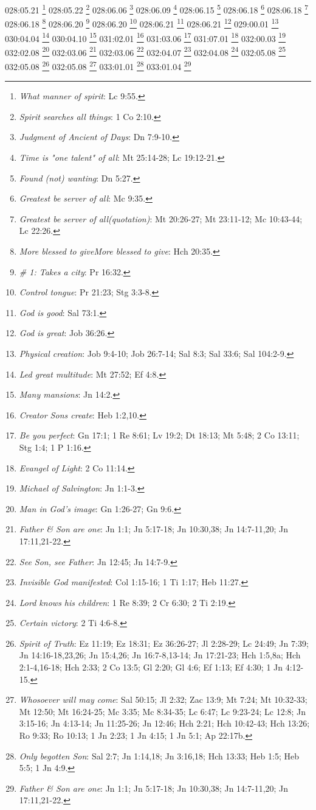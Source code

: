 {028:05.21 \footnote{\textit{What manner of spirit}: Lc 9:55.}
028:05.22 \footnote{\textit{Spirit searches all things}: 1 Co 2:10.}
028:06.06 \footnote{\textit{Judgment of Ancient of Days}: Dn 7:9-10.}
028:06.09 \footnote{\textit{Time is "one talent" of all}: Mt 25:14-28; Lc 19:12-21.}
028:06.15 \footnote{\textit{Found (not) wanting}: Dn 5:27.}
028:06.18 \footnote{\textit{Greatest be server of all}: Mc 9:35.}
028:06.18 \footnote{\textit{Greatest be server of all(quotation)}: Mt 20:26-27; Mt 23:11-12; Mc 10:43-44; Lc 22:26.}
028:06.18 \footnote{\textit{More blessed to giveMore blessed to give}: Hch 20:35.}
028:06.20 \footnote{\textit{# 1: Takes a city}: Pr 16:32.}
028:06.20 \footnote{\textit{Control tongue}: Pr 21:23; Stg 3:3-8.}
028:06.21 \footnote{\textit{God is good}: Sal 73:1.}
028:06.21 \footnote{\textit{God is great}: Job 36:26.}
029:00.01 \footnote{\textit{Physical creation}: Job 9:4-10; Job 26:7-14; Sal 8:3; Sal 33:6; Sal 104:2-9.}
030:04.04 \footnote{\textit{Led great multitude}: Mt 27:52; Ef 4:8.}
030:04.10 \footnote{\textit{Many mansions}: Jn 14:2.}
031:02.01 \footnote{\textit{Creator Sons create}: Heb 1:2,10.}
031:03.06 \footnote{\textit{Be you perfect}: Gn 17:1; 1 Re 8:61; Lv 19:2; Dt 18:13; Mt 5:48; 2 Co 13:11; Stg 1:4; 1 P 1:16.}
031:07.01 \footnote{\textit{Evangel of Light}: 2 Co 11:14.}
032:00.03 \footnote{\textit{Michael of Salvington}: Jn 1:1-3.}
032:02.08 \footnote{\textit{Man in God's image}: Gn 1:26-27; Gn 9:6.}
032:03.06 \footnote{\textit{Father & Son are one}: Jn 1:1; Jn 5:17-18; Jn 10:30,38; Jn 14:7-11,20; Jn 17:11,21-22.}
032:03.06 \footnote{\textit{See Son, see Father}: Jn 12:45; Jn 14:7-9.}
032:04.07 \footnote{\textit{Invisible God manifested}: Col 1:15-16; 1 Ti 1:17; Heb 11:27.}
032:04.08 \footnote{\textit{Lord knows his children}: 1 Re 8:39; 2 Cr 6:30; 2 Ti 2:19.}
032:05.08 \footnote{\textit{Certain victory}: 2 Ti 4:6-8.}
032:05.08 \footnote{\textit{Spirit of Truth}: Ez 11:19; Ez 18:31; Ez 36:26-27; Jl 2:28-29; Lc 24:49; Jn 7:39; Jn 14:16-18,23,26; Jn 15:4,26; Jn 16:7-8,13-14; Jn 17:21-23; Hch 1:5,8a; Hch 2:1-4,16-18; Hch 2:33; 2 Co 13:5; Gl 2:20; Gl 4:6; Ef 1:13; Ef 4:30; 1 Jn 4:12-15.}
032:05.08 \footnote{\textit{Whosoever will may come}: Sal 50:15; Jl 2:32; Zac 13:9; Mt 7:24; Mt 10:32-33; Mt 12:50; Mt 16:24-25; Mc 3:35; Mc 8:34-35; Lc 6:47; Lc 9:23-24; Lc 12:8; Jn 3:15-16; Jn 4:13-14; Jn 11:25-26; Jn 12:46; Hch 2:21; Hch 10:42-43; Hch 13:26; Ro 9:33; Ro 10:13; 1 Jn 2:23; 1 Jn 4:15; 1 Jn 5:1; Ap 22:17b.}
033:01.01 \footnote{\textit{Only begotten Son}: Sal 2:7; Jn 1:14,18; Jn 3:16,18; Hch 13:33; Heb 1:5; Heb 5:5; 1 Jn 4:9.}
033:01.04 \footnote{\textit{Father & Son are one}: Jn 1:1; Jn 5:17-18; Jn 10:30,38; Jn 14:7-11,20; Jn 17:11,21-22.}
}
